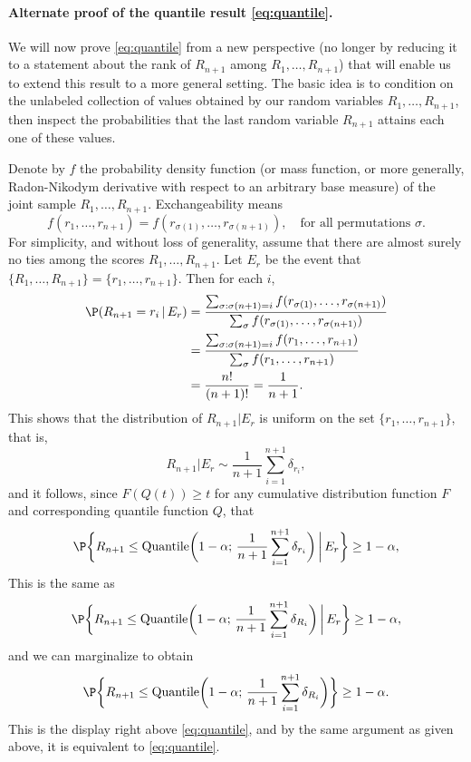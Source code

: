 \documentclass{article}
\begin{document}
\paragraph{Alternate proof of the quantile result \eqref{eq:quantile}.}

We will now prove \eqref{eq:quantile} from a new perspective (no longer by
reducing it to a statement about the rank of $R_{n+1}$ among
$R_1,\dots,R_{n+1}$) that will enable us to extend this result to a more general
setting. The basic idea is to condition on the unlabeled collection of values
obtained by our random variables $R_1,\dots,R_{n+1}$, then inspect the
probabilities that the last random variable $R_{n+1}$ attains each one of these
values.  

Denote by $f$ the probability density function (or mass function, or more
generally, Radon-Nikodym derivative with respect to an arbitrary base measure)
of the joint sample $R_1,\dots,R_{n+1}$. Exchangeability means
\[
f(r_1,\dots,r_{n+1}) = f(r_{\sigma(1)}, \dots, r_{\sigma(n+1)}), \quad \text{for 
  all permutations $\sigma$}.
\] 
For simplicity, and without loss of generality, assume that there are almost
surely no ties among the scores $R_1,\dots,R_{n+1}$. Let $E_r$ be the event that 
$\{R_1,\dots,R_{n+1}\}=\{r_1,\dots,r_{n+1}\}$. Then for each $i$,  
\begin{align*}
\P(R_{n+1}=r_i \,|\, E_r)
&= \frac{\sum_{\sigma : \sigma(n+1)=i} f(r_{\sigma(1)}, \dots, r_{\sigma(n+1)})}  
{\sum_\sigma f(r_{\sigma(1)}, \dots, r_{\sigma(n+1)})} \\
&= \frac{\sum_{\sigma: \sigma(n+1)=i} f(r_1, \dots, r_{n+1})}  
{\sum_\sigma f(r_1, \dots, r_{n+1})} \\
&= \frac{n!}{(n+1)!} = \frac{1}{n+1}. 
\end{align*}
This shows that the distribution of $R_{n+1}|E_r$ is uniform on the set 
$\{r_1,\dots,r_{n+1}\}$, that is,
\[
R_{n+1}|E_r \sim \frac{1}{n+1}\sum_{i=1}^{n+1}\delta_{r_i},
\]
and it follows, since $F(Q(t)) \geq t$ for any cumulative distribution function
$F$ and corresponding quantile function $Q$, that   
\[
\P\bigg\{ R_{n+1} \leq \Quantile\bigg( 1-\alpha; \,
\frac{1}{n+1}\sum_{i=1}^{n+1}\delta_{r_i} \bigg) \, \bigg| \, 
E_r\bigg\} \geq 1-\alpha,
\]
This is the same as
\[
\P\bigg\{ R_{n+1} \leq \Quantile\bigg( 1-\alpha; \,
\frac{1}{n+1}\sum_{i=1}^{n+1}\delta_{R_i}\bigg) \, \bigg| \,  
E_r\bigg\} \geq 1-\alpha,
\]
and we can marginalize to obtain   
\[
\P\bigg\{ R_{n+1} \leq \Quantile\bigg( 1-\alpha; \,
\frac{1}{n+1}\sum_{i=1}^{n+1}\delta_{R_i}\bigg) \bigg\} \geq 1-\alpha.
\]
This is the display right above \eqref{eq:quantile}, and by the same argument as
given above, it is equivalent to \eqref{eq:quantile}.
\end{document}

